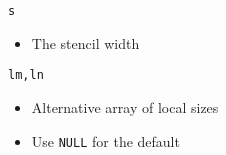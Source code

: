 \begin{frame}[fragile]
\vspace*{-0.3cm}
\begin{block}{\lstinline|s|}
  \vspace*{-0.2cm}
  \begin{itemize}
    \item The stencil width
  \end{itemize}
\end{block}

\vspace*{-0.3cm}
\begin{block}{\lstinline|lm,ln|}
  \vspace*{-0.2cm}
  \begin{itemize}
    \item Alternative array of local sizes
    \item Use \lstinline|NULL| for the default
  \end{itemize}
\end{block}

\end{frame}
